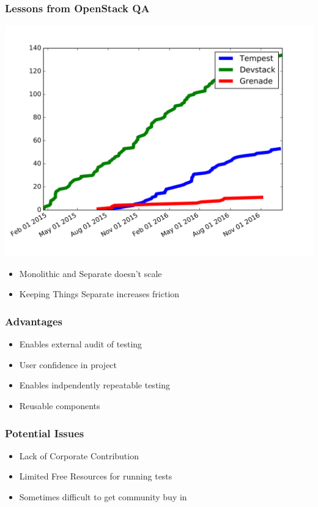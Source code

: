 \documentclass[aspectratio=169,11pt,hyperref={colorlinks=true}]{beamer}
\begin{document}
\begin{frame}
    \frametitle{Lessons from OpenStack QA}
    \begin{center}
        \includegraphics[width=.80\textwidth]{plugins.png}
    \end{center}
    \begin{itemize}
        \item Monolithic and Separate doesn't scale
        \item Keeping Things Separate increases friction
    \end{itemize}
\end{frame}

\begin{frame}
    \frametitle{Advantages}
    \begin{itemize}
        \item Enables external audit of testing
        \item User confidence in project
        \item Enables indpendently repeatable testing
        \item Reusable components
    \end{itemize}
\end{frame}

\begin{frame}
    \frametitle{Potential Issues}
    \begin{itemize}
        \item Lack of Corporate Contribution
        \item Limited Free Resources for running tests
        \item Sometimes difficult to get community buy in
    \end{itemize}
\end{frame}
\end{document}

